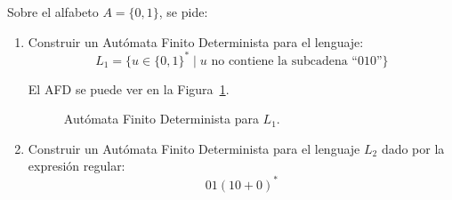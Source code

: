 \documentclass[12pt]{article}
\begin{document}
\begin{ejercicio}
    Sobre el alfabeto $A=\{0,1\}$, se pide:
    \begin{enumerate}
        \item Construir un Autómata Finito Determinista para el lenguaje:
            \begin{equation*}
                L_1 = \{u\in {\{0,1\}}^{\ast} \mid u \text{\ no contiene la subcadena ``} 010\text{''}\}
            \end{equation*}

            El AFD se puede ver en la Figura~\ref{fig:afd1}.
            \begin{figure}
                \centering
                \caption{Autómata Finito Determinista para $L_1$.}
                \label{fig:afd1}
            \end{figure}
        \item Construir un Autómata Finito Determinista para el lenguaje $L_2$ dado por la expresión regular:
            \begin{equation*}
                01{(10+0)}^{\ast}
            \end{equation*}


\end{enumerate}
\end{ejercicio}
\end{document}
